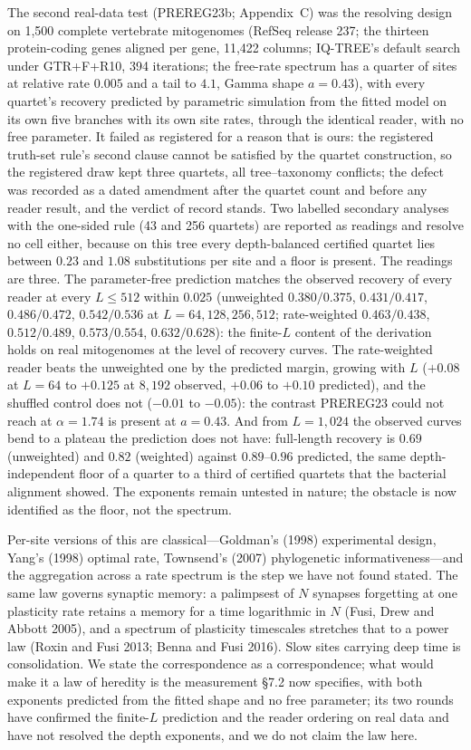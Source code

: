 \documentclass[11pt]{article}
\begin{document}
The second real-data test (PREREG23b; Appendix~C) was the resolving design on 1,500 complete vertebrate mitogenomes (RefSeq release 237; the thirteen protein-coding genes aligned per gene, 11,422 columns; IQ-TREE's default search under GTR+F+R10, 394 iterations; the free-rate spectrum has a quarter of sites at relative rate $0.005$ and a tail to $4.1$, Gamma shape $a=0.43$), with every quartet's recovery predicted by parametric simulation from the fitted model on its own five branches with its own site rates, through the identical reader, with no free parameter. It failed as registered for a reason that is ours: the registered truth-set rule's second clause cannot be satisfied by the quartet construction, so the registered draw kept three quartets, all tree--taxonomy conflicts; the defect was recorded as a dated amendment after the quartet count and before any reader result, and the verdict of record stands. Two labelled secondary analyses with the one-sided rule (43 and 256 quartets) are reported as readings and resolve no cell either, because on this tree every depth-balanced certified quartet lies between $0.23$ and $1.08$ substitutions per site and a floor is present. The readings are three. The parameter-free prediction matches the observed recovery of every reader at every $L\le512$ within $0.025$ (unweighted $0.380/0.375$, $0.431/0.417$, $0.486/0.472$, $0.542/0.536$ at $L=64,128,256,512$; rate-weighted $0.463/0.438$, $0.512/0.489$, $0.573/0.554$, $0.632/0.628$): the finite-$L$ content of the derivation holds on real mitogenomes at the level of recovery curves. The rate-weighted reader beats the unweighted one by the predicted margin, growing with $L$ ($+0.08$ at $L=64$ to $+0.125$ at $8{,}192$ observed, $+0.06$ to $+0.10$ predicted), and the shuffled control does not ($-0.01$ to $-0.05$): the contrast PREREG23 could not reach at $\alpha=1.74$ is present at $a=0.43$. And from $L=1{,}024$ the observed curves bend to a plateau the prediction does not have: full-length recovery is $0.69$ (unweighted) and $0.82$ (weighted) against $0.89$--$0.96$ predicted, the same depth-independent floor of a quarter to a third of certified quartets that the bacterial alignment showed. The exponents remain untested in nature; the obstacle is now identified as the floor, not the spectrum.

Per-site versions of this are classical---Goldman's (1998) experimental design, Yang's (1998) optimal rate, Townsend's (2007) phylogenetic informativeness---and the aggregation across a rate spectrum is the step we have not found stated. The same law governs synaptic memory: a palimpsest of $N$ synapses forgetting at one plasticity rate retains a memory for a time logarithmic in $N$ (Fusi, Drew and Abbott 2005), and a spectrum of plasticity timescales stretches that to a power law (Roxin and Fusi 2013; Benna and Fusi 2016). Slow sites carrying deep time is consolidation. We state the correspondence as a correspondence; what would make it a law of heredity is the measurement \S7.2 now specifies, with both exponents predicted from the fitted shape and no free parameter; its two rounds have confirmed the finite-$L$ prediction and the reader ordering on real data and have not resolved the depth exponents, and we do not claim the law here.
\end{document}
